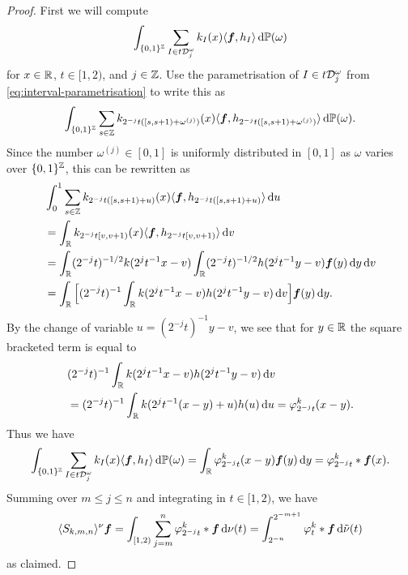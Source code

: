 \begin{proof}
  First we will compute
  \begin{equation*}
    \int_{\{0,1\}^{\mathbb{Z}}} \sum_{I \in t\mathcal{D}_{j}^{\omega}} k_{I}(x) \langle \bm{f}, h_{I} \rangle \, \mathrm{d}\mathbb{P}(\omega)
  \end{equation*}
  for $x \in \mathbb{R}$, $t \in [1,2)$, and $j \in \mathbb{Z}$.
  Use the parametrisation of $I \in t\mathcal{D}_{j}^{\omega}$ from \eqref{eq:interval-parametrisation} to write this as
  \begin{equation*}
    \int_{\{0,1\}^{\mathbb{Z}}} \sum_{s \in \mathbb{Z}} k_{2^{-j}t([s,s+1) + \omega^{(j)})}(x) \langle \bm{f}, h_{2^{-j}t([s,s+1) + \omega^{(j)})} \rangle \, \mathrm{d}\mathbb{P}(\omega).
  \end{equation*}
  Since the number $\omega^{(j)} \in [0,1]$ is uniformly distributed in $[0,1]$ as $\omega$ varies over $\{0,1\}^{\mathbb{Z}}$, this can be rewritten as
  \begin{equation*}
    \begin{aligned}
    &\int_{0}^{1} \sum_{s \in \mathbb{Z}} k_{2^{-j}t([s,s+1) + u)}(x) \langle \bm{f}, h_{2^{-j}t([s,s+1) + u)} \rangle \, \mathrm{d} u \\
    &= \int_{\mathbb{R}}  k_{2^{-j}t[v,v+1)}(x) \langle \bm{f}, h_{2^{-j}t[v,v+1)} \rangle \, \mathrm{d} v \\
    &= \int_{\mathbb{R}} (2^{-j} t)^{-1/2} k(2^{j} t^{-1} x - v)\int_{\mathbb{R}} (2^{-j} t)^{-1/2} h(2^{j} t^{-1} y - v)\bm{f}(y) \, \mathrm{d} y \, \mathrm{d} v \\
    &= \int_{\mathbb{R}} \Big[ (2^{-j} t)^{-1} \int_{\mathbb{R}} k(2^j t^{-1} x - v) h(2^j t^{-1} y - v) \, \mathrm{d} v \Big] \bm{f}(y) \, \mathrm{d} y .
  \end{aligned}
\end{equation*}
By the change of variable $u = (2^{-j}t)^{-1} y - v$, we see that for $y \in \mathbb{R}$ the square bracketed term is equal to
\begin{equation*}
  \begin{aligned}
    &(2^{-j} t)^{-1} \int_{\mathbb{R}} k(2^j t^{-1} x - v) h(2^j t^{-1} y - v) \, \mathrm{d} v \\
    &= (2^{-j} t)^{-1} \int_{\mathbb{R}} k(2^j t^{-1} (x-y) + u) h(u) \, \mathrm{d} u
    = \varphi_{2^{-j} t}^{k}(x-y).
  \end{aligned}
\end{equation*}
Thus we have
\begin{equation*}
  \int_{\{0,1\}^{\mathbb{Z}}} \sum_{I \in t\mathcal{D}_{j}^{\omega}} k_{I}(x) \langle \bm{f}, h_{I} \rangle \, \mathrm{d}\mathbb{P}(\omega)
  = \int_{\mathbb{R}} \varphi_{2^{-j} t}^{k}(x-y) \bm{f}(y) \, \mathrm{d} y
  = \varphi_{2^{-j} t}^{k} \ast \bm{f}(x).
\end{equation*}
Summing over $m \leq j \leq n$ and integrating in $t \in [1,2)$, we have
\begin{equation*}
  \langle S_{k,m,n} \rangle^{\nu} \bm{f} = \int_{[1,2)} \sum_{j=m}^{n} \varphi_{2^{-j} t}^{k} \ast \bm{f}   \, \mathrm{d}\nu(t) = \int_{2^{-n}}^{2^{-m+1}} \varphi^{k}_{t} \ast \bm{f} \, \mathrm{d}\tilde{\nu}(t)
\end{equation*}
as claimed.
\end{proof}


